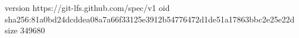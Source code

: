 version https://git-lfs.github.com/spec/v1
oid sha256:81a0bd24dcddea08a7a66f33125e3912b54776472d1de51a17863bbc2e25e22d
size 349680
